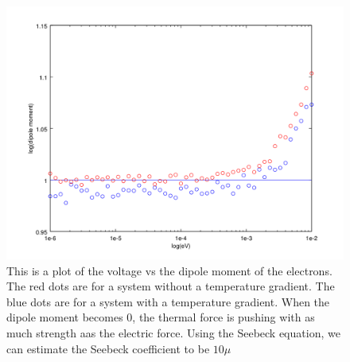 \begin{figure}[htbp]
\begin{center}
\includegraphics[scale=.50]{VoltageVsDipole.png}
\caption{This is a plot of the voltage vs the dipole moment of the electrons. The red dots are for a system without a temperature gradient. The blue dots are for a system with a temperature gradient. When the dipole moment becomes 0, the thermal force is pushing with as much strength aas the electric force. Using the Seebeck equation, we can estimate the Seebeck coefficient to be $10 \mu$}
\label{TvJ}
\end{center}
\end{figure}

